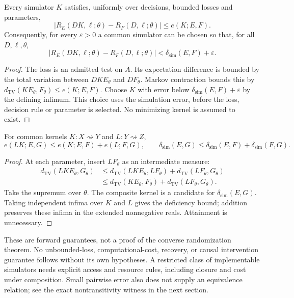 \begin{theorem}\label{thm:risk-transfer}
Every simulator $K$ satisfies, uniformly over decisions, bounded losses
and parameters,
\[
 |R_E(DK,\ell;\theta)-R_F(D,\ell;\theta)|\le e(K;E,F).
\]
Consequently, for every $\varepsilon>0$ a common simulator can be chosen
so that, for all $D,\ell,\theta$,
\[
 |R_E(DK,\ell;\theta)-R_F(D,\ell;\theta)|
 <\delta_{\mathrm{sim}}(E,F)+\varepsilon.
\]
\end{theorem}
\begin{proof}
The loss is an admitted test on $A$. Its expectation difference is
bounded by the total variation between $DKE_\theta$ and $DF_\theta$.
Markov contraction bounds this by
$d_{\mathrm{TV}}(KE_\theta,F_\theta)\le e(K;E,F)$.
Choose $K$ with error below
$\delta_{\mathrm{sim}}(E,F)+\varepsilon$ by the defining infimum.
This choice uses the simulation error, before the loss, decision rule
or parameter is selected. No minimizing kernel is assumed to exist.
\end{proof}

\begin{theorem}
\label{thm:simulation-composition}
For common kernels $K:X\rightsquigarrow Y$ and $L:Y\rightsquigarrow Z$,
\[
 e(LK;E,G)\le e(K;E,F)+e(L;F,G),
 \qquad
 \delta_{\mathrm{sim}}(E,G)
 \le\delta_{\mathrm{sim}}(E,F)+\delta_{\mathrm{sim}}(F,G).
\]
\end{theorem}
\begin{proof}
At each parameter, insert $LF_\theta$ as an intermediate measure:
\begin{align*}
 d_{\mathrm{TV}}(LKE_\theta,G_\theta)
 &\le d_{\mathrm{TV}}(LKE_\theta,LF_\theta)
       +d_{\mathrm{TV}}(LF_\theta,G_\theta)\\
 &\le d_{\mathrm{TV}}(KE_\theta,F_\theta)
       +d_{\mathrm{TV}}(LF_\theta,G_\theta).
\end{align*}
Take the supremum over $\theta$. The composite kernel is a candidate
for $\delta_{\mathrm{sim}}(E,G)$. Taking independent infima over $K$
and $L$ gives the deficiency bound; addition preserves these infima
in the extended nonnegative reals. Attainment is unnecessary.
\end{proof}

These are forward guarantees, not a proof of the converse randomization
theorem. No unbounded-loss, computational-cost, recovery, or causal
intervention guarantee follows without its own hypotheses. A restricted
class of implementable simulators needs explicit access and resource
rules, including closure and cost under composition. Small pairwise
error also does not supply an equivalence relation; see the exact
nontransitivity witness in the next section.
